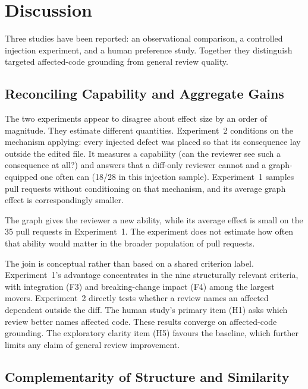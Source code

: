 \section{Discussion}
\label{sec:discussion}

Three studies have been reported: an observational comparison, a controlled
injection experiment, and a human preference study. Together they distinguish
targeted affected-code grounding from general review quality.

\subsection{Reconciling Capability and Aggregate Gains}
\label{sec:discussion-reconciliation}

The two experiments appear to disagree about effect size by an order of
magnitude. They estimate different quantities. Experiment~2 conditions on
the mechanism applying: every injected defect was placed so that its
consequence lay outside the edited file. It measures a capability (can the
reviewer see such a consequence at all?) and answers that a diff-only
reviewer cannot and a graph-equipped one often can (18/28 in this injection
sample). Experiment~1 samples pull requests without conditioning on that
mechanism, and its average graph effect is correspondingly smaller.

The graph gives the reviewer a new ability, while its average effect is small
on the 35 pull requests in Experiment~1. The experiment does not estimate how
often that ability would matter in the broader population of pull requests.

The join is conceptual rather than based on a shared criterion label.
Experiment~1's advantage concentrates in the nine structurally relevant
criteria, with integration (F3) and breaking-change impact (F4) among the
largest movers. Experiment~2 directly tests whether a review names an affected
dependent outside the diff. The human study's primary item (H1) asks which
review better names affected code.
These results converge on affected-code grounding. The exploratory clarity
item (H5) favours the baseline, which
further limits any claim of general review improvement.

\subsection{Complementarity of Structure and Similarity}
\label{sec:discussion-complementarity}

